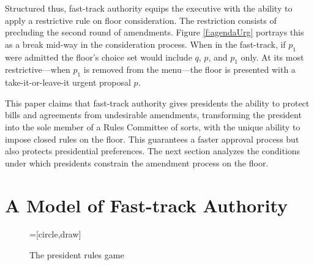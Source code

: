 \documentclass[letter,12pt]{article}
\begin{document}

Structured thus, fast-track authority equips the executive with the ability to apply a restrictive rule on floor consideration. The restriction consists of precluding the second round of amendments. Figure \ref{f:agendaUrg} portrays this as a break mid-way in the consideration process. When in the fast-track, if $p_1$ were admitted the floor's choice set would include $q$, $p$, and $p_1$ only. At its most restrictive---when $p_1$ is removed from the menu---the floor is presented with a take-it-or-leave-it urgent proposal $p$.


This paper claims that fast-track authority gives presidents the ability to protect bills and agreements from undesirable amendments, transforming the president into the sole member of a Rules Committee of sorts, with the unique ability to impose closed rules on the floor. This guarantees a faster approval process but also protects presidential preferences. The next section analyzes the conditions under which presidents constrain the amendment process on the floor. 

\section{A Model of Fast-track Authority}

\begin{figure}
  \centering
    \caption{The president rules game}\label{F:game}
    =[circle,draw]
\end{figure}
\end{document}
